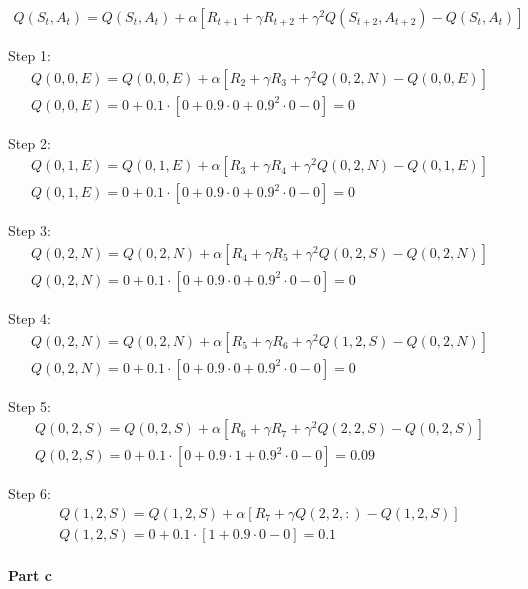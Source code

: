 \documentclass[12pt]{article}
\begin{document}
\begin{gather}
  Q(S_t, A_t) = Q(S_t, A_t) + \alpha [R_{t+1} + \gamma R_{t+2} + \gamma^2 Q(S_{t+2}, A_{t+2}) - Q(S_t, A_t)] \label{eq:2-TD}
\end{gather}

Step 1:
\begin{gather*}
  Q(0, 0, E) = Q(0, 0, E) + \alpha [R_2 + \gamma R_3 + \gamma^2 Q(0, 2, N) - Q(0, 0, E)] \\
  Q(0, 0, E) = 0 + 0.1 \cdot [0 + 0.9 \cdot 0 + 0.9^2 \cdot 0 - 0] = 0
\end{gather*}

Step 2:
\begin{gather*}
  Q(0, 1, E) = Q(0, 1, E) + \alpha [R_3 + \gamma R_4 + \gamma^2 Q(0, 2, N) - Q(0, 1, E)] \\
  Q(0, 1, E) = 0 + 0.1 \cdot [0 + 0.9 \cdot 0 + 0.9^2 \cdot 0 - 0] = 0
\end{gather*}

Step 3:
\begin{gather*}
  Q(0, 2, N) = Q(0, 2, N) + \alpha [R_4 + \gamma R_5 + \gamma^2 Q(0, 2, S) - Q(0, 2, N)] \\
  Q(0, 2, N) = 0 + 0.1 \cdot [0 + 0.9 \cdot 0 + 0.9^2 \cdot 0 - 0] = 0
\end{gather*}

Step 4:
\begin{gather*}
  Q(0, 2, N) = Q(0, 2, N) + \alpha [R_5 + \gamma R_6 + \gamma^2 Q(1, 2, S) - Q(0, 2, N)] \\
  Q(0, 2, N) = 0 + 0.1 \cdot [0 + 0.9 \cdot 0 + 0.9^2 \cdot 0 - 0] = 0
\end{gather*}

Step 5:
\begin{gather*}
  Q(0, 2, S) = Q(0, 2, S) + \alpha [R_6 + \gamma R_7 + \gamma^2 Q(2, 2, S) - Q(0, 2, S)] \\
  Q(0, 2, S) = 0 + 0.1 \cdot [0 + 0.9 \cdot 1 + 0.9^2 \cdot 0 - 0] = 0.09
\end{gather*}

Step 6:
\begin{gather*}
  Q(1, 2, S) = Q(1, 2, S) + \alpha [R_7 + \gamma Q(2, 2, :) - Q(1, 2, S)] \\
  Q(1, 2, S) = 0 + 0.1 \cdot [1 + 0.9 \cdot 0 - 0] = 0.1
\end{gather*}

\paragraph{Part c}
\end{document}
